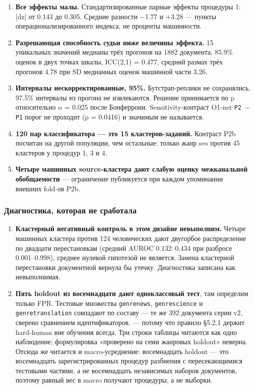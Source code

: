 \documentclass[11pt,a4paper]{article}
\renewcommand{\_}{\textunderscore\allowbreak}
\begin{document}
\begin{enumerate}
\item[7.] \textbf{Все эффекты малы.} Стандартизированные парные эффекты процедуры 1: |d\_z| от 0.143 до 0.305. Средние разности $-$1.77 и +3.28 — пункты операционализированного индекса, не проценты машинности.
\item[8.] \textbf{Разрешающая способность судьи ниже величины эффекта.} 15 уникальных значений медианы трёх прогонов на 1882 документа, 85.9\% оценок в двух точках шкалы, ICC(2,1) = 0.477, средний размах трёх прогонов 4.78 при SD медианных оценок машинной части 3.26.
\item[9.] \textbf{Интервалы нескорректированные, 95\%.} Бутстрап-реплики не сохранялись, 97.5\% интервалы из прогона не извлекаются. Решение принимается по p относительно $\alpha$ = 0.025 после Бонферрони. Sensitivity-контраст O1-net \texttt{P2 $-$ P1} порог не проходит (p = 0.0416) и значимым не называется.
\item[10.] \textbf{120 пар классификатора — это 15 кластеров-заданий.} Контраст P2b посчитан на другой популяции, чем остальные: только жанр seo против 45 кластеров у процедур 1, 3 и 4.
\item[11.] \textbf{Четыре машинных source-кластера дают слабую оценку межканальной обобщаемости} — ограничение публикуется при каждом упоминании внешних fold-ов P2b.
\end{enumerate}

\subsubsection{Диагностика, которая не сработала}

\begin{enumerate}
\item[12.] \textbf{Кластерный негативный контроль в этом дизайне невыполним.} Четыре машинных кластера против 124 человеческих дают двугорбое распределение по двадцати перестановкам (средний AUROC 0.132–0.434 при разбросе 0.001–0.998), среднее нулевой гипотезой не является. Замена кластерной перестановки документной вернула бы утечку. Диагностика записана как невыполнимая.
\item[13.] \textbf{Пять holdout из восемнадцати дают одноклассовый тест}, там определим только FPR. Тестовые множества \texttt{genre\_news}, \texttt{genre\_science} и \texttt{genre\_translation} совпадают по составу — те же 392 документа серии v2, сверено сравнением идентификаторов, — потому что правило §5.2.1 держит hard-human вне обучения всегда. Три строки таблицы читаются как одно наблюдение; формулировка «проверено на семи жанровых holdout» неверна. Отсюда же читается и macro-усреднение: восемнадцать holdout — это восемнадцать зарегистрированных процедур разбиения с пересекающимися тестовыми частями, а не восемнадцать независимых наборов документов, поэтому равный вес в macro получают процедуры, а не выборки.
\end{enumerate}
\end{document}
